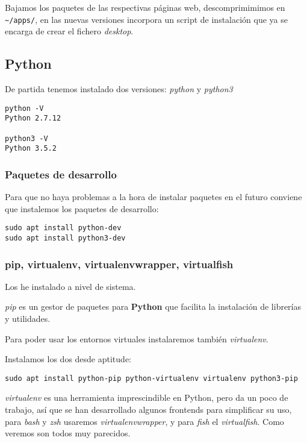 \documentclass[
  12pt,
  spanish,
]{article}
\begin{document}
Bajamos los paquetes de las respectivas páginas web, descomprimimimos en
\texttt{\textasciitilde{}/apps/}, en las nuevas versiones incorpora un
script de instalación que ya se encarga de crear el fichero
\emph{desktop}.

\hypertarget{python}{%
\subsection{Python}\label{python}}

De partida tenemos instalado dos versiones: \emph{python} y
\emph{python3}

\begin{verbatim}
python -V
Python 2.7.12

python3 -V
Python 3.5.2
\end{verbatim}

\hypertarget{paquetes-de-desarrollo}{%
\subsubsection{Paquetes de desarrollo}\label{paquetes-de-desarrollo}}

Para que no haya problemas a la hora de instalar paquetes en el futuro
conviene que instalemos los paquetes de desarrollo:

\begin{verbatim}
sudo apt install python-dev
sudo apt install python3-dev
\end{verbatim}

\hypertarget{pip-virtualenv-virtualenvwrapper-virtualfish}{%
\subsubsection{pip, virtualenv, virtualenvwrapper,
virtualfish}\label{pip-virtualenv-virtualenvwrapper-virtualfish}}

Los he instalado a nivel de sistema.

\emph{pip} es un gestor de paquetes para \textbf{Python} que facilita la
instalación de librerías y utilidades.

Para poder usar los entornos virtuales instalaremos también
\emph{virtualenv}.

Instalamos los dos desde aptitude:

\begin{verbatim}
sudo apt install python-pip python-virtualenv virtualenv python3-pip
\end{verbatim}

\emph{virtualenv} es una herramienta imprescindible en Python, pero da
un poco de trabajo, así que se han desarrollado algunos frontends para
simplificar su uso, para \emph{bash} y \emph{zsh} usaremos
\emph{virtualenvwrapper}, y para \emph{fish} el \emph{virtualfish}. Como
veremos son todos muy parecidos.
\end{document}
